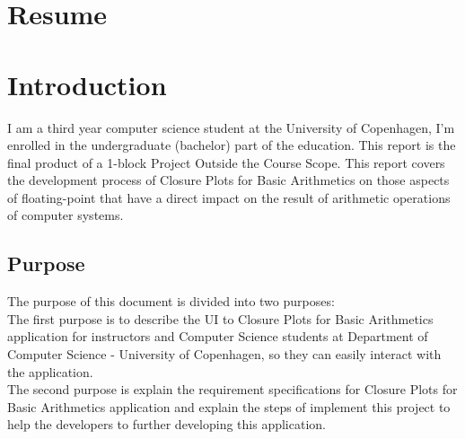 \documentclass[11pt]{article}
\begin{document}
\section*{Resume}

\newpage
\begin{center}
\tableofcontents
\end{center}

\newpage
\section{Introduction}
I am a third year computer science student at the University of Copenhagen, I'm enrolled in the undergraduate (bachelor) part of the education. This report is the final product of a 1-block Project Outside the Course Scope. This report covers the development process of Closure Plots for Basic Arithmetics on those aspects of floating-point that have a direct impact on the result of arithmetic operations of computer systems.

\subsection{Purpose}
The purpose of this document is divided into two purposes:\\

The first purpose is to describe the UI to Closure Plots for Basic Arithmetics application for instructors and Computer Science students at Department of Computer Science - University of Copenhagen, so they can easily interact with the application.\\

The second purpose is explain the requirement specifications for Closure Plots for Basic Arithmetics application and explain the steps of implement this project to help the developers to further developing this application.



\end{document}
